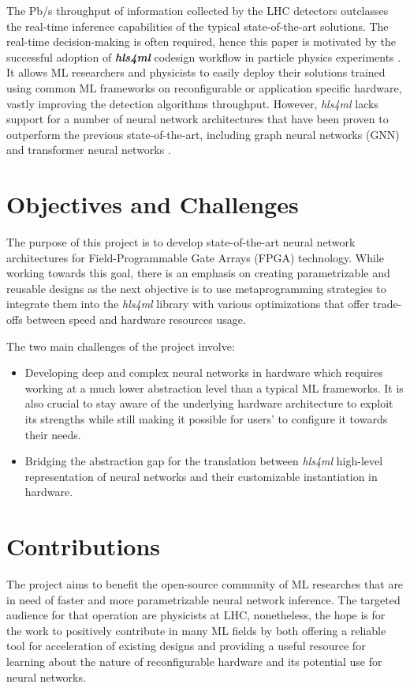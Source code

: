 The Pb/s throughput of information collected by the LHC detectors outclasses the real-time inference capabilities of the typical state-of-the-art solutions. The real-time decision-making is often required, hence this paper is motivated by the successful adoption of  \textit{\textbf{hls4ml}} codesign workflow in particle physics experiments \cite{RefWorks:RefID:8-fahim2021hls4ml:}. It allows ML researchers and physicists to easily deploy their solutions trained using common ML frameworks on reconfigurable or application specific hardware, vastly improving the detection algorithms throughput. However, \textit{hls4ml} lacks support for a number of neural network architectures that have been proven to outperform the previous state-of-the-art, including graph neural networks (GNN) \cite{RefWorks:RefID:9-newman2019jedi-net:, RefWorks:RefID:11-elabd2021graph} and transformer neural networks \cite{RefWorks:RefID:3-yuan2021constituentnet:}.


\section{Objectives and Challenges}
The purpose of this project is to develop state-of-the-art neural network architectures for Field-Programmable Gate Arrays (FPGA) technology. While working towards this goal, there is an emphasis on creating parametrizable and reusable designs as the next objective is to use metaprogramming strategies to integrate them into the \textit{hls4ml} library with various optimizations that offer trade-offs between speed and hardware resources usage.

The two main challenges of the project involve:
\begin{itemize}
  \item Developing deep and complex neural networks in hardware which requires working at a much lower abstraction level than a typical ML frameworks. It is also crucial to stay aware of the underlying hardware architecture to exploit its strengths while still making it possible for users' to configure it towards their needs.
  \item Bridging the abstraction gap for the translation between \textit{hls4ml} high-level representation of neural networks and their customizable instantiation in hardware.
\end{itemize}


\section{Contributions}
The project aims to benefit the open-source community of ML researches that are in need of faster and more parametrizable neural network inference. The targeted audience for that operation are physicists at LHC, nonetheless, the hope is for the work to positively contribute in many ML fields by both offering a reliable tool for acceleration of existing designs and providing a useful resource for learning about the nature of reconfigurable hardware and its potential use for neural networks.